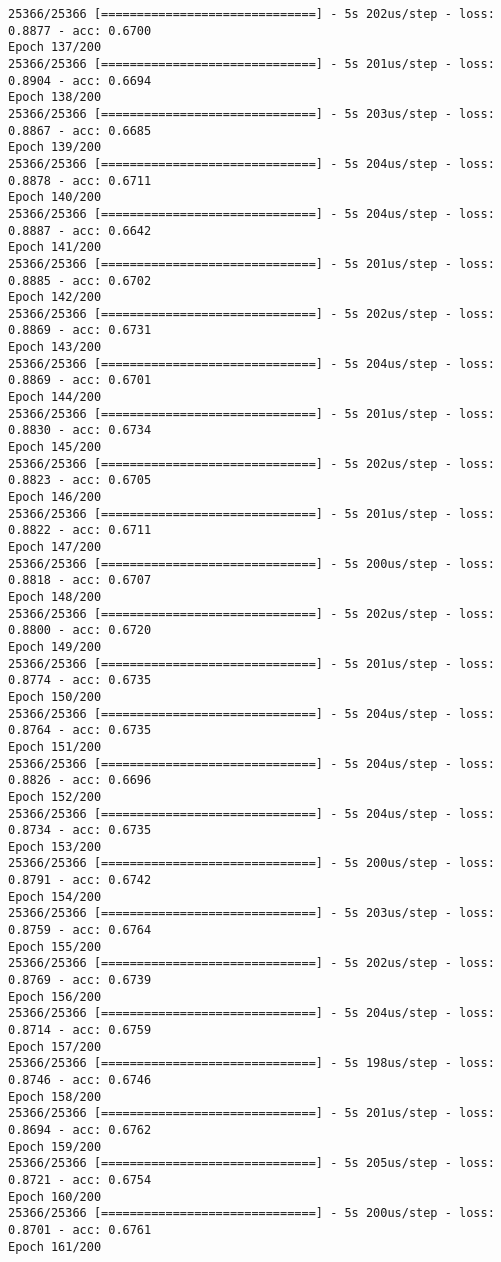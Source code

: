 \documentclass[11pt]{article}
\begin{document}
\begin{Verbatim}[commandchars=\\\{\}]
25366/25366 [==============================] - 5s 202us/step - loss: 0.8877 - acc: 0.6700
Epoch 137/200
25366/25366 [==============================] - 5s 201us/step - loss: 0.8904 - acc: 0.6694
Epoch 138/200
25366/25366 [==============================] - 5s 203us/step - loss: 0.8867 - acc: 0.6685
Epoch 139/200
25366/25366 [==============================] - 5s 204us/step - loss: 0.8878 - acc: 0.6711
Epoch 140/200
25366/25366 [==============================] - 5s 204us/step - loss: 0.8887 - acc: 0.6642
Epoch 141/200
25366/25366 [==============================] - 5s 201us/step - loss: 0.8885 - acc: 0.6702
Epoch 142/200
25366/25366 [==============================] - 5s 202us/step - loss: 0.8869 - acc: 0.6731
Epoch 143/200
25366/25366 [==============================] - 5s 204us/step - loss: 0.8869 - acc: 0.6701
Epoch 144/200
25366/25366 [==============================] - 5s 201us/step - loss: 0.8830 - acc: 0.6734
Epoch 145/200
25366/25366 [==============================] - 5s 202us/step - loss: 0.8823 - acc: 0.6705
Epoch 146/200
25366/25366 [==============================] - 5s 201us/step - loss: 0.8822 - acc: 0.6711
Epoch 147/200
25366/25366 [==============================] - 5s 200us/step - loss: 0.8818 - acc: 0.6707
Epoch 148/200
25366/25366 [==============================] - 5s 202us/step - loss: 0.8800 - acc: 0.6720
Epoch 149/200
25366/25366 [==============================] - 5s 201us/step - loss: 0.8774 - acc: 0.6735
Epoch 150/200
25366/25366 [==============================] - 5s 204us/step - loss: 0.8764 - acc: 0.6735
Epoch 151/200
25366/25366 [==============================] - 5s 204us/step - loss: 0.8826 - acc: 0.6696
Epoch 152/200
25366/25366 [==============================] - 5s 204us/step - loss: 0.8734 - acc: 0.6735
Epoch 153/200
25366/25366 [==============================] - 5s 200us/step - loss: 0.8791 - acc: 0.6742
Epoch 154/200
25366/25366 [==============================] - 5s 203us/step - loss: 0.8759 - acc: 0.6764
Epoch 155/200
25366/25366 [==============================] - 5s 202us/step - loss: 0.8769 - acc: 0.6739
Epoch 156/200
25366/25366 [==============================] - 5s 204us/step - loss: 0.8714 - acc: 0.6759
Epoch 157/200
25366/25366 [==============================] - 5s 198us/step - loss: 0.8746 - acc: 0.6746
Epoch 158/200
25366/25366 [==============================] - 5s 201us/step - loss: 0.8694 - acc: 0.6762
Epoch 159/200
25366/25366 [==============================] - 5s 205us/step - loss: 0.8721 - acc: 0.6754
Epoch 160/200
25366/25366 [==============================] - 5s 200us/step - loss: 0.8701 - acc: 0.6761
Epoch 161/200

\end{Verbatim}
\end{document}
